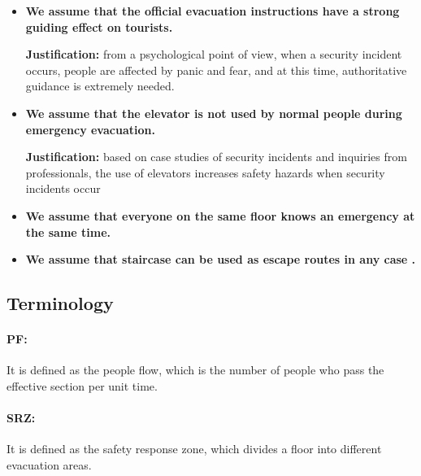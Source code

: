 \begin{itemize}
    \item \textbf{We assume that the official evacuation instructions have a strong guiding effect on tourists.} 
    
    \textbf{Justification:} from a psychological point of view, when a security incident occurs, people are affected by panic and fear, and at this time, authoritative guidance is extremely needed.
    \item \textbf{We assume that the elevator is not used by normal people during emergency evacuation.}
    
    \textbf{Justification:} based on case studies of security incidents and inquiries from professionals, the use of elevators increases safety hazards when security incidents occur

    \item \textbf{We assume that everyone on the same floor knows an emergency at the same time.}
    \item \textbf{We assume that staircase can be used as escape routes in any case .}
    
     

\end{itemize}
\subsection{Terminology}
\paragraph{PF:}It is defined as the people flow, which is the number of people who pass the effective section per unit time.
\paragraph{SRZ:}It is defined as the safety response zone, which divides a floor into different evacuation areas.
